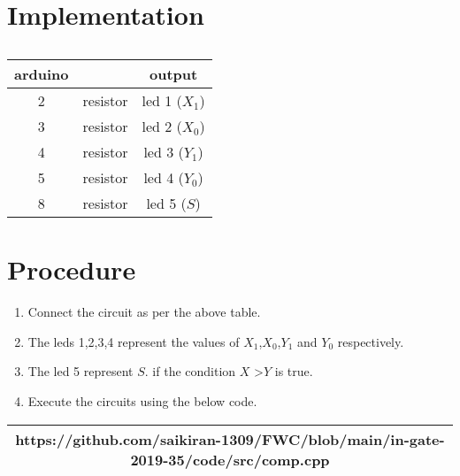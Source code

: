 \documentclass{article}
\begin{document}
 \section{Implementation}
 \begin{table}[h]
     \centering
     \begin{tabular}{|c|c|c|}
        \hline arduino  &  & output  \\
         \hline 2 & resistor  &led 1 ($X_1$)\\
         \hline 3 & resistor  &led 2 ($X_0$)\\
         \hline 4 & resistor  &led 3 ($Y_1$)\\
         \hline 5 & resistor  &led 4 ($Y_0$)\\
         \hline 8 & resistor  &led 5 ($S$)\\
         \hline
     \end{tabular}
     \caption{}
     \label{tab:my_label}
 \end{table}
 \pagebreak

 \section{Procedure}
 \begin{enumerate}
     \item Connect the circuit as per the above table.
     \item The leds 1,2,3,4 represent the values of $X_1$,$X_0$,$Y_1$ and $Y_0$ respectively.
     \item The led 5 represent $S$. if the condition $X$ \textgreater $Y$ is true.
     \item Execute the circuits using the below code.
 \end{enumerate}
 \begin{table}[h]
	   \centering
	   \begin{tabular}{|c|}
	   \hline
	   https://github.com/saikiran-1309/FWC/blob/main/in-gate-2019-35/code/src/comp.cpp\\
	   \hline
	   \end{tabular}
   \end{table}
\end{document}
